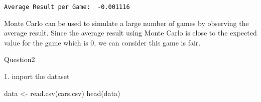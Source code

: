 \documentclass[
  letterpaper,
  DIV=11,
  numbers=noendperiod]{scrartcl}
\newenvironment{Shaded}{\begin{snugshade}}{\end{snugshade}}
\newcommand{\FunctionTok}[1]{\textcolor[rgb]{0.28,0.35,0.67}{#1}}
\newcommand{\NormalTok}[1]{\textcolor[rgb]{0.00,0.23,0.31}{#1}}
\newcommand{\OtherTok}[1]{\textcolor[rgb]{0.00,0.23,0.31}{#1}}
\newcommand{\StringTok}[1]{\textcolor[rgb]{0.13,0.47,0.30}{#1}}
\begin{document}
\begin{verbatim}
Average Result per Game:  -0.001116 
\end{verbatim}

Monte Carlo can be used to simulate a large number of games by observing
the average result. Since the average result using Monte Carlo is close
to the expected value for the game which is 0, we can consider this game
is fair.

Question2

1. import the dataset

\begin{Shaded}
\begin{Highlighting}[]
\NormalTok{data }\OtherTok{\textless{}{-}} \FunctionTok{read.csv}\NormalTok{(}\StringTok{\textquotesingle{}cars.csv\textquotesingle{}}\NormalTok{)}
\FunctionTok{head}\NormalTok{(data)}
\end{Highlighting}
\end{Shaded}
\end{document}
